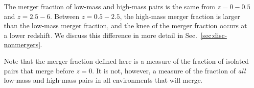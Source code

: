 \documentclass[twocolumn,linenumbers]{aastex631}
\begin{document}
    The merger fraction of low-mass and high-mass pairs is the same from $z=0-0.5$ and $z=2.5-6$. 
    Between $z=0.5-2.5$, the high-mass merger fraction is larger than the low-mass merger fraction, and the knee of the merger fraction occurs at a lower redshift. 
    We discuss this difference in more detail in Sec.~\ref{sec:disc-nonmergers}.

    Note that the merger fraction defined here is a measure of the fraction of isolated pairs that merge before $z=0$. It is not, however, a measure of the fraction of \textit{all} low-mass and high-mass pairs in all environments that will merge. 




\end{document}
